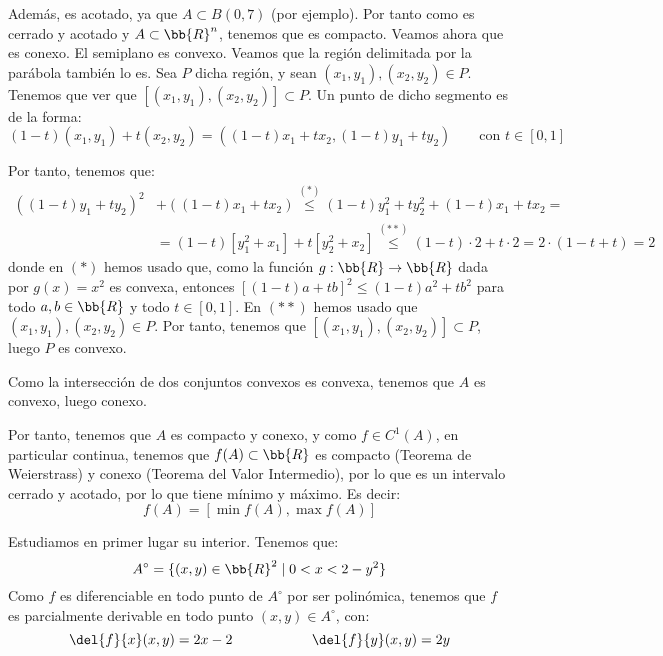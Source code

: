 \begin{ejercicio}
    Además, es acotado, ya que $A\subset B(0, 7)$ (por ejemplo). Por tanto como es cerrado y acotado y $A\subset \bb{R}^n$, tenemos que es compacto. Veamos ahora que es conexo.
    El semiplano es convexo. Veamos que la región delimitada por la parábola también lo es. Sea $P$ dicha región,
    y sean $(x_1,y_1), (x_2,y_2)\in P$. Tenemos que ver que $[(x_1,y_1), (x_2,y_2)]\subset P$.
    Un punto de dicho segmento es de la forma:
    \begin{equation*}
        (1-t)(x_1,y_1)+t(x_2,y_2) = ((1-t)x_1+tx_2, (1-t)y_1+ty_2) \qquad \text{con } t\in [0,1]
    \end{equation*}

    Por tanto, tenemos que:
    \begin{equation*}
        \begin{split}
            \left((1-t)y_1+ty_2\right)^2 &+ \left((1-t)x_1+tx_2\right)
            \stackrel{(\ast)}{\leq}
            (1-t)y_1^2 + ty_2^2 + (1-t)x_1 + tx_2
            = \\ &= (1-t)[y_1^2 + x_1] + t[y_2^2 + x_2]
            \stackrel{(\ast\ast)}{\leq} (1-t)\cdot 2 + t\cdot 2
            = 2\cdot (1-t+t) = 2
        \end{split}
    \end{equation*}
    donde en $(\ast)$ hemos usado que, como la función $g:\bb{R}\to \bb{R}$ dada por $g(x)=x^2$ es convexa, entonces $[(1-t)a + tb]^2 \leq (1-t)a^2 + tb^2$ para todo $a,b\in \bb{R}$ y todo $t\in [0,1]$.
    En $(\ast\ast)$ hemos usado que $(x_1,y_1), (x_2,y_2)\in P$. Por tanto, tenemos que $[(x_1,y_1), (x_2,y_2)]\subset P$, luego $P$ es convexo.

    Como la intersección de dos conjuntos convexos es convexa, tenemos que $A$ es convexo, luego conexo.

    Por tanto, tenemos que $A$ es compacto y conexo, y como $f\in C^1(A)$, en particular continua, tenemos que
    $f(A)\subset \bb{R}$ es compacto (Teorema de Weierstrass) y conexo (Teorema del Valor Intermedio), por lo que es un intervalo cerrado y acotado, por lo que tiene mínimo y máximo. Es decir:
    \begin{equation*}
        f(A) = [\min f(A), \max f(A)]
    \end{equation*}

    Estudiamos en primer lugar su interior. Tenemos que: $$A^\circ = \{(x,y)\in \bb{R}^2\mid 0< x < 2-y^2\}$$
    Como $f$ es diferenciable en todo punto de $A^\circ$ por ser polinómica, tenemos que $f$ es parcialmente derivable en todo punto $(x,y)\in A^\circ$, con:
    \begin{equation*}
        \del{f}{x}(x,y) = 2x-2 \hspace{2cm}
        \del{f}{y}(x,y) = 2y
    \end{equation*}
    

\end{ejercicio}
